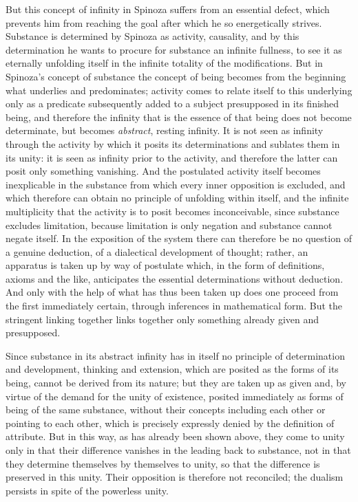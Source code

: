 But this concept of infinity in Spinoza suffers from an essential
defect, which prevents him from reaching the goal after which he so
energetically strives. Substance is determined by Spinoza as activity,
causality, and by this determination he wants to procure for substance
an infinite fullness, to see it as eternally unfolding itself in the
infinite totality of the modifications. But in Spinoza's concept of
substance the concept of being becomes from the beginning what
underlies and predominates; activity comes to relate itself to this
underlying only as a predicate subsequently added to a subject
presupposed in its finished being, and therefore the infinity that is
the essence of that being does not become determinate, but becomes
\emph{abstract}, resting infinity. It is not seen as infinity through
the activity by which it posits its determinations and sublates them in
its unity: it is seen as infinity prior to the activity, and therefore
the latter can posit only something vanishing. And the postulated
activity itself becomes inexplicable in the substance from which every
inner opposition is excluded, and which therefore can obtain no
principle of unfolding within itself, and the infinite multiplicity
that the activity is to posit becomes inconceivable, since substance
excludes limitation, because limitation is only negation and substance
cannot negate itself. In the exposition of the system there can
therefore be no question of a genuine deduction, of a dialectical
development of thought; rather, an apparatus is taken up by way of
postulate which, in the form of definitions, axioms and the like,
anticipates the essential determinations without deduction. And only
with the help of what has thus been taken up does one proceed from the
first immediately certain, through inferences in mathematical form.
But the stringent linking together links together only something
already given and presupposed.

Since substance in its abstract infinity has in itself no principle of
determination and development, thinking and extension, which are
posited as the forms of its being, cannot be derived from
its nature; but they are taken up as given and, by virtue of the demand
for the unity of existence, posited immediately as forms of being of
the same substance, without their concepts including each other or
pointing to each other, which is precisely expressly denied by the
definition of attribute. But in this way, as has already been shown
above, they come to unity only in that their difference vanishes in
the leading back to substance, not in that they determine themselves by
themselves to unity, so that the difference is preserved in this unity.
Their opposition is therefore not reconciled; the dualism persists in
spite of the powerless unity.

